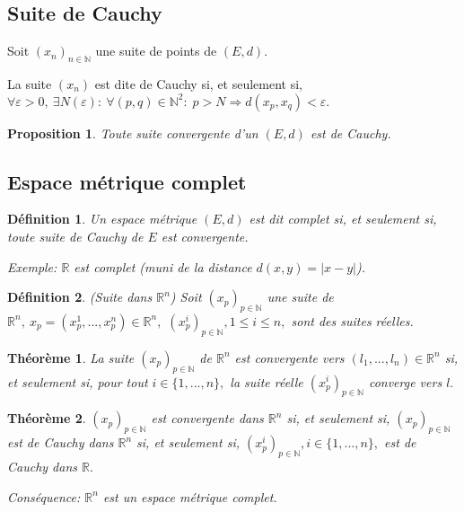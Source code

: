 \documentclass[11pt,a4paper]{report}
\newtheorem{theorem}{Théorème}[section]
\newtheorem{definition}{Définition}[section]
\newtheorem{proposition}{Proposition}[section]
\begin{document}
\subsection{Suite de Cauchy}

Soit $(x_n)_{n\in \mathbb{N}}$ une suite de points de $(E,d).$

La suite $(x_n)$ est dite de Cauchy si, et seulement si,
$\forall \varepsilon>0,\:\exists N(\varepsilon):\:\forall(p,q)\in \mathbb{N}^2:\;p>N\Rightarrow d(x_p,x_q)<\varepsilon.$

\begin{proposition}
Toute suite convergente d'un $(E,d)$ est de Cauchy.
\end{proposition}





\subsection{Espace métrique complet}
\begin{definition}
Un espace métrique $(E,d)$ est dit complet si, et seulement si, toute suite de Cauchy de $E$ est convergente.

Exemple: $\mathbb{R}$ est complet (muni de la distance $d(x,y)=|x-y|$).
\end{definition}

\begin{definition}(Suite dans $\mathbb{R}^n$)
Soit $(x_p)_{p\in \mathbb{N}}$ une suite de $\mathbb{R}^n,\:x_p=(x_{p}^{1},...,x_{p}^{n})\in \mathbb{R}^n,$ $(x_{p}^{i})_{p\in \mathbb{N}},1\leq i\leq n,$ sont des suites réelles.
\end{definition}

\begin{theorem}

La suite $(x_p)_{p\in \mathbb{N}}$ de $\mathbb{R}^n$ est convergente vers $(l_1,...,l_n)\in \mathbb{R}^n$ si, et seulement si, pour tout $i\in \{1,...,n\},$ la suite réelle $(x_{p}^{i})_{p\in \mathbb{N}}$ converge vers $l.$

\end{theorem}

\begin{theorem}
$(x_p)_{p\in \mathbb{N}}$ est convergente dans $\mathbb{R}^n$ si, et seulement si, $(x_p)_{p\in \mathbb{N}}$ est de Cauchy dans $\mathbb{R}^n$ si, et seulement si, $(x_{p}^{i})_{p\in \mathbb{N}},i\in \{1,...,n\},$ est de Cauchy dans $\mathbb{R}.$

Conséquence: $\mathbb{R}^n$ est un espace métrique complet.
\end{theorem}
\end{document}
